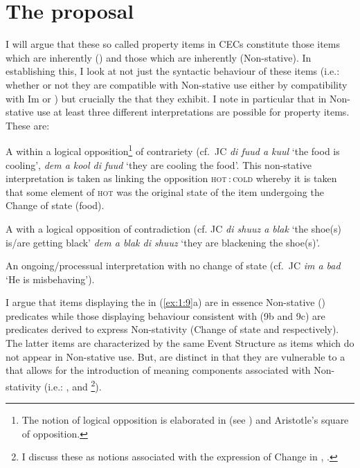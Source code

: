 \section{The proposal}\label{sec:1.7}

I will argue that these so called property items in CECs constitute
those items which are inherently  () and those which are
inherently  (Non-stative).  In establishing this, I look at
not just the syntactic behaviour of these items (i.e.: whether or not
they are compatible with Non-stative use either by compatibility with
Im or ) but crucially the
 that they exhibit.  I note in particular that in
Non-stative use at least three different interpretations are possible
for property items. These are:

\ea\label{ex:1:9}
  \ea \parbox[t]{\linewidth}{A  within a logical opposition\footnote{The
    notion of logical opposition is elaborated in  (see
  \citealt{Horn1989}) and Aristotle's square of opposition.} of contrariety
  (cf.\ JC \textit{di fuud a kuul} `the food is cooling', \textit{dem a kool di
  fuud} `they are cooling the food'.  This non-stative interpretation is taken
  as linking the opposition \textsc{hot}\,:\,\textsc{cold} whereby it is taken that some element of
  \textsc{hot} was the original state of the item undergoing the Change of state (food).}
  \ex \parbox[t]{\linewidth}{A  with a logical opposition of
  contradiction (cf. JC \textit{di shuuz a blak} `the shoe(s) is\slash are getting
  black' \textit{dem a blak di shuuz} `they are blackening the shoe(s)'.}
  \ex \parbox[t]{\linewidth}{An ongoing\slash processual interpretation with no change of state (cf.\ JC
  \textit{im a bad} `He is misbehaving').}
  \z
\z

I argue that items displaying the  in (\ref{ex:1:9}a) are in
essence Non-stative () predicates while those displaying behaviour
consistent with (9b and 9c) are  predicates derived to express
Non-stativity (Change of state and  respectively).  The latter items are
characterized by the same Event Structure as items which do not appear in
Non-stative use.  But, are distinct in that they are vulnerable to a
 that allows for the introduction of meaning components
associated with Non-stativity (i.e.: \CAUSE, \BECOME and \DO\footnote{I discuss
these as notions associated with the expression of Change in ,
.}).

